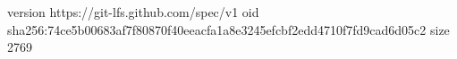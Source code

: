 version https://git-lfs.github.com/spec/v1
oid sha256:74ce5b00683af7f80870f40eeacfa1a8e3245efcbf2edd4710f7fd9cad6d05c2
size 2769
